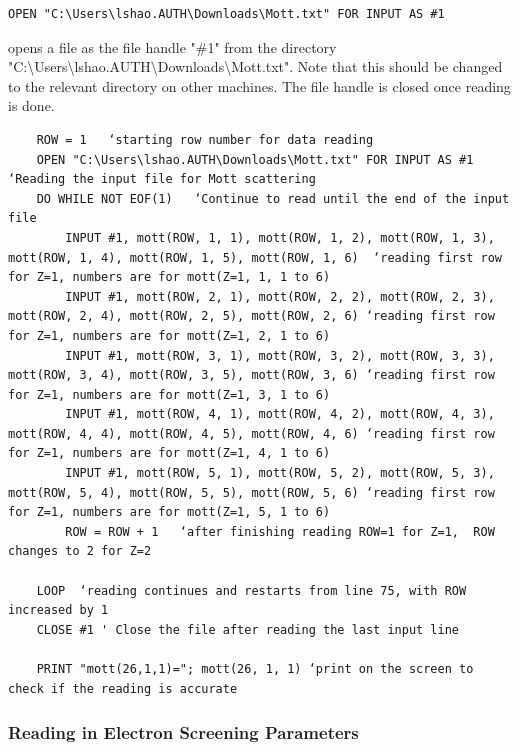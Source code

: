 \documentclass[10pt, reqno]{exam}
\begin{document}
{\begin{verbatim}
OPEN "C:\Users\lshao.AUTH\Downloads\Mott.txt" FOR INPUT AS #1
\end{verbatim}

opens a file as the file handle "\#1" from the directory "C:\textbackslash Users\textbackslash lshao.AUTH\textbackslash Downloads\textbackslash Mott.txt". Note that this should be changed to the relevant directory on other machines. The file handle is closed once reading is done. \par


\begin{verbatim}
    ROW = 1   ‘starting row number for data reading
    OPEN "C:\Users\lshao.AUTH\Downloads\Mott.txt" FOR INPUT AS #1 ‘Reading the input file for Mott scattering
    DO WHILE NOT EOF(1)   ‘Continue to read until the end of the input file
        INPUT #1, mott(ROW, 1, 1), mott(ROW, 1, 2), mott(ROW, 1, 3), mott(ROW, 1, 4), mott(ROW, 1, 5), mott(ROW, 1, 6)  ‘reading first row for Z=1, numbers are for mott(Z=1, 1, 1 to 6)
        INPUT #1, mott(ROW, 2, 1), mott(ROW, 2, 2), mott(ROW, 2, 3), mott(ROW, 2, 4), mott(ROW, 2, 5), mott(ROW, 2, 6) ‘reading first row for Z=1, numbers are for mott(Z=1, 2, 1 to 6)
        INPUT #1, mott(ROW, 3, 1), mott(ROW, 3, 2), mott(ROW, 3, 3), mott(ROW, 3, 4), mott(ROW, 3, 5), mott(ROW, 3, 6) ‘reading first row for Z=1, numbers are for mott(Z=1, 3, 1 to 6)
        INPUT #1, mott(ROW, 4, 1), mott(ROW, 4, 2), mott(ROW, 4, 3), mott(ROW, 4, 4), mott(ROW, 4, 5), mott(ROW, 4, 6) ‘reading first row for Z=1, numbers are for mott(Z=1, 4, 1 to 6)
        INPUT #1, mott(ROW, 5, 1), mott(ROW, 5, 2), mott(ROW, 5, 3), mott(ROW, 5, 4), mott(ROW, 5, 5), mott(ROW, 5, 6) ‘reading first row for Z=1, numbers are for mott(Z=1, 5, 1 to 6)
        ROW = ROW + 1   ‘after finishing reading ROW=1 for Z=1,  ROW changes to 2 for Z=2
    
    LOOP  ‘reading continues and restarts from line 75, with ROW increased by 1
    CLOSE #1 ' Close the file after reading the last input line

    PRINT "mott(26,1,1)="; mott(26, 1, 1) ‘print on the screen to check if the reading is accurate
\end{verbatim}
\subsubsection{Reading in Electron Screening Parameters}

}
\end{document}
